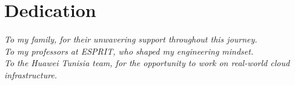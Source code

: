 \chapter*{Dedication}
\thispagestyle{empty}

\vspace*{3cm}

\begin{center}
\textit{To my family, for their unwavering support throughout this journey.}\\[1cm]
\textit{To my professors at ESPRIT, who shaped my engineering mindset.}\\[1cm]
\textit{To the Huawei Tunisia team, for the opportunity to work on real-world cloud infrastructure.}
\end{center}

\newpage
